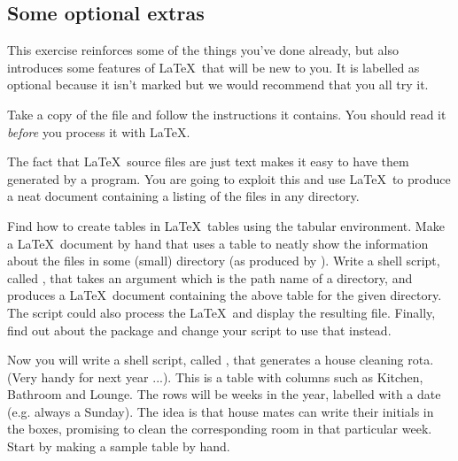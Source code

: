 \begin{refsection}
\section{Some optional extras}
\label{sec:some-optional-extras}


This exercise reinforces some of the things you've done already, but
also introduces some features of \LaTeX\ that will be new to you. It is labelled as optional because it isn't marked but we would recommend that you all try it.

Take a copy of the file
 and follow the
instructions it contains. You should read it \emph{before} you process
it with \LaTeX.

The fact that \LaTeX\ source files are just text makes it easy to have them generated by a program. You are going to exploit this and use \LaTeX\ to produce a neat document containing a listing of the files in any directory.

Find how to create tables in \LaTeX\ tables using the tabular
environment.  Make a \LaTeX\ document by hand that uses a table to
neatly show the information about the files in some (small) directory
(as produced by ).  Write a shell script, called
, that takes an argument which is the path name of a
directory, and produces a \LaTeX\ document containing the above table
for the given directory. The script could also process the \LaTeX\ and
display the resulting  file.  Finally, find out about the 
package and change your script to use that instead.

\begin{demonote}
  \small
  
\end{demonote}

Now you will write a shell script, called , that generates a house cleaning rota. (Very handy for next year ...). This is a table with columns such as Kitchen, Bathroom and Lounge. The rows will be weeks in the year, labelled with a date (e.g. always a Sunday). The idea is that house mates can write their initials in the boxes, promising to clean the corresponding room in that particular week. Start by making a sample table by hand.


\end{refsection}
